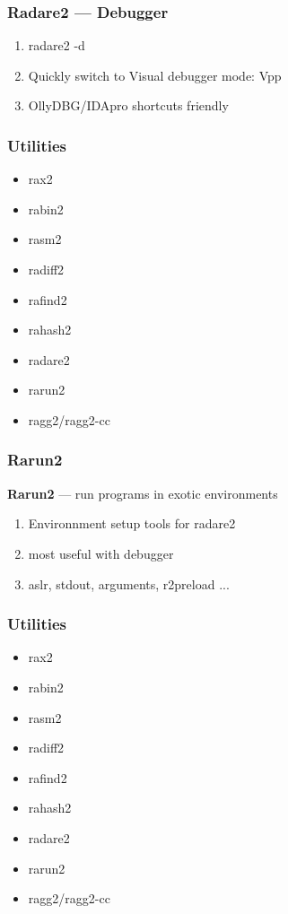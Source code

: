 \documentclass[10pt, compress]{beamer}
\begin{document}
\begin{frame}[fragile]
  \frametitle{Radare2 — Debugger}
  \begin{enumerate}
  \item radare2 -d
  \item Quickly switch to Visual debugger mode: Vpp
  \item OllyDBG/IDApro shortcuts friendly
 \end{enumerate}
\end{frame}

\begin{frame}[fragile]
  \frametitle{Utilities}
     \begin{itemize}
        \item rax2
        \item rabin2
        \item rasm2
        \item radiff2
        \item rafind2
        \item rahash2
        \item radare2
        \item \alert{rarun2}
        \item ragg2/ragg2-cc
      \end{itemize}
\end{frame}

\begin{frame}[fragile]
  \frametitle{Rarun2}
  \center\textbf{Rarun2} — run programs in exotic environments
  \noindent\makebox[\linewidth]{\rule{\paperwidth}{0.4pt}}
  \begin{enumerate}
  \item Environnment setup tools for radare2
  \item most useful with debugger
  \item aslr, stdout, arguments, r2preload ...
 \end{enumerate}
\end{frame}

\begin{frame}[fragile]
  \frametitle{Utilities}
     \begin{itemize}
        \item rax2
        \item rabin2
        \item rasm2
        \item radiff2
        \item rafind2
        \item rahash2
        \item radare2
        \item rarun2
        \item \alert{ragg2/ragg2-cc}
      \end{itemize}
\end{frame}
\end{document}
